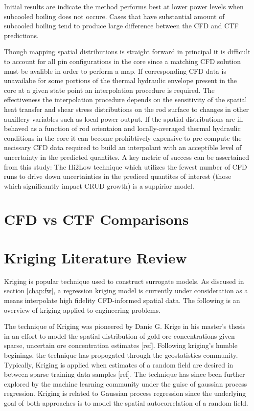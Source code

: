 Initial results are indicate the method performs best at lower power levels when subcooled boiling does not occure.
Cases that have substantial amount of subcooled boiling tend to produce large difference between the CFD and CTF predictions.  

Though mapping spatial distributions is straight forward in principal it is difficult to account for all pin configurations in the core since a matching CFD solution must be avalible in order to perform a map.  If corresponding CFD data is unavailabe for some portions of the thermal hydraulic envelope present in the core at a given state point an interpolation procedure is required.  The effectiveness the interpolation procedure depends on the sensitivity of the spatial heat transfer and shear stress distributions on the rod surface to changes in other auxillery variables such as local power output.  If the spatial distributions are ill behaved as a function of rod orientaion and locally-averaged thermal hydraulic conditions in the core it can become prohibtively expensive to pre-compute the necissary CFD data required to build an interpolant with an acceptible level of uncertainty in the predicted quantites.  
A key metric of success can be assertained from this study:  The Hi2Low technique which utilizes the fewest number of CFD runs to drive down uncertainties in the prediced quantites of interest (those which significantly impact CRUD growth) is a suppirior model.


\section{CFD vs CTF Comparisons}


\section{Kriging Literature Review}

Kriging is popular technique used to construct surrogate models.  As discused in section \ref{chap:fw}, a regression kriging model is currently under consideration as a means interpolate high fidelity CFD-informed spatial data. The following is an overview of kriging applied to engineering problems.

The technique of Kriging was pioneered by Danie G. Krige in his master's thesis in an effort to model the spatial distribution of gold ore concentrations given sparse, uncertain ore concentration estimates [ref]. Following kriging's humble beginings, the technique has propogated through the geostatistics community. Typically, Kriging is applied when estimates of a random field are desired in between sparse training data samples [ref].  The technique has since been further explored by the machine learning community under the guise of gaussian process regression.
Kriging is related to Gaussian process regression since the underlying goal of both approaches is to model the spatial autocorrelation of a random field.  
